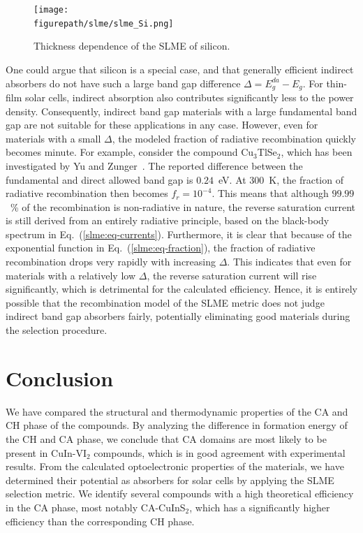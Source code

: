 \begin{refsection}
\begin{figure}[ht] 
	\centering 
		\texttt{[image: \\figurepath/slme/slme\_Si.png]} 
	\caption{Thickness dependence of the SLME of silicon.} 
	\label{slme:fig-SLME_Si} 
\end{figure} 
 
One could argue that silicon is a special case, and that generally efficient 
indirect absorbers do not have such a large band gap difference \mbox{$\Delta 
= E_g ^{da}- E_g$}. For thin-film solar cells, indirect absorption also 
contributes significantly less to the power density. Consequently, indirect 
band gap materials with a large fundamental band gap are not suitable for 
these applications in any case. However, even for materials with a small 
$\Delta$, the modeled fraction of radiative recombination quickly becomes 
minute. For example, consider the compound Cu$_3$TlSe$_2$, which has been 
investigated by Yu and Zunger~\cite{Yu2012}. The reported difference between 
the fundamental and direct allowed band gap is $0.24$~\si{\electronvolt}. At 
300~\si{\kelvin}, the fraction of radiative recombination then becomes 
\mbox{$f_r = 10^{-4}$}. This means that although $99.99$~\% of the 
recombination is non-radiative in nature, the reverse saturation current is 
still derived from an entirely radiative principle, based on the black-body 
spectrum in Eq.~(\ref{slme:eq-currents}). Furthermore, it is clear that 
because of the exponential function in Eq.~(\ref{slme:eq-fraction}), the 
fraction of radiative recombination drops very rapidly with increasing 
$\Delta$. This indicates that even for materials with a relatively low 
$\Delta$, the reverse saturation current will rise significantly, which is 
detrimental for the calculated efficiency. Hence, it is entirely possible that 
the recombination model of the SLME metric does not judge indirect band gap 
absorbers fairly, potentially eliminating good materials during the selection 
procedure.\\ 
 
\section{Conclusion} 
 
We have compared the structural and thermodynamic properties of the CA and CH 
phase of the compounds. By analyzing the difference in formation energy of the 
CH and CA phase, we conclude that CA domains are most likely to be present in 
\mbox{CuIn-VI$_2$} compounds, which is in good agreement with experimental 
results. From the calculated optoelectronic properties of the materials, we 
have determined their potential as absorbers for solar cells by applying the 
SLME selection metric. We identify several compounds with a high theoretical 
efficiency in the CA phase, most notably \mbox{CA-CuInS$_2$}, which has a 
significantly higher efficiency than the corresponding CH phase. 
 

\end{refsection}
